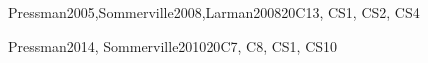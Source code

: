 \begin{syllabus}
\begin{unit}{\SESoftwareVerificationandValidation}{}{Pressman2005,Sommerville2008,Larman2008}{20}{C13, CS1, CS2, CS4}
\begin{learningoutcomes}
			\item \SESoftwareVerificationandValidationLODiscussTheTesting [\Familiarity] %
			\item \SESoftwareVerificationandValidationLOEvaluateAFor [\Usage] %
			\item \SESoftwareVerificationandValidationLOCompareStatic [\Familiarity] %
			\item \SESoftwareVerificationandValidationLOIdentifyTheOfDevelopment [\Familiarity] %
			\item \SESoftwareVerificationandValidationLODiscussTheThe [\Usage] %
			\item \SESoftwareVerificationandValidationLODescribeTechniquesVerification [\Familiarity] %
			\item \SESoftwareVerificationandValidationLODescribeApproachesEstimation [\Familiarity] %
			\item \SESoftwareVerificationandValidationLOEstimateThe [\Usage] %
			\item \SESoftwareVerificationandValidationLOConductAn [\Usage] %
		\end{learningoutcomes}
	\end{unit}
	
	\begin{unit}{\SEToolsandEnvironments}{}{Pressman2014, Sommerville2010}{20}{C7, C8, CS1, CS10}
		\begin{topics}
			\item \SEToolsandEnvironmentsTopicSoftware
			\item \SEToolsandEnvironmentsTopicRelease
			\item \SEToolsandEnvironmentsTopicRequierements
			\item \SEToolsandEnvironmentsTopicTesting
			\item \SEToolsandEnvironmentsTopicProgramming
			\item \SEToolsandEnvironmentsTopicTool
		\end{topics}
		\begin{learningoutcomes}%
			\item \SEToolsandEnvironmentsLODescribeTheCentralized
			\item \SEToolsandEnvironmentsLOIdentifyConfiguration
			\item \SEToolsandEnvironmentsLODescribeHowAnd
			\item \SEToolsandEnvironmentsLODescribeTheAre
			\item \SEToolsandEnvironmentsLODemonstrateTheUse
		\end{learningoutcomes}
	\end{unit}
	
	\begin{coursebibliography}
	\end{coursebibliography}
	
	\end{syllabus}
	
